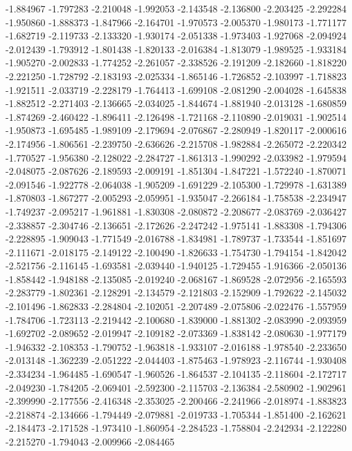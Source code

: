 -1.884967
-1.797283
-2.210048
-1.992053
-2.143548
-2.136800
-2.203425
-2.292284
-1.950860
-1.888373
-1.847966
-2.164701
-1.970573
-2.005370
-1.980173
-1.771177
-1.682719
-2.119733
-2.133320
-1.930174
-2.051338
-1.973403
-1.927068
-2.094924
-2.012439
-1.793912
-1.801438
-1.820133
-2.016384
-1.813079
-1.989525
-1.933184
-1.905270
-2.002833
-1.774252
-2.261057
-2.338526
-2.191209
-2.182660
-1.818220
-2.221250
-1.728792
-2.183193
-2.025334
-1.865146
-1.726852
-2.103997
-1.718823
-1.921511
-2.033719
-2.228179
-1.764413
-1.699108
-2.081290
-2.004028
-1.645838
-1.882512
-2.271403
-2.136665
-2.034025
-1.844674
-1.881940
-2.013128
-1.680859
-1.874269
-2.460422
-1.896411
-2.126498
-1.721168
-2.110890
-2.019031
-1.902514
-1.950873
-1.695485
-1.989109
-2.179694
-2.076867
-2.280949
-1.820117
-2.000616
-2.174956
-1.806561
-2.239750
-2.636626
-2.215708
-1.982884
-2.265072
-2.220342
-1.770527
-1.956380
-2.128022
-2.284727
-1.861313
-1.990292
-2.033982
-1.979594
-2.048075
-2.087626
-2.189593
-2.009191
-1.851304
-1.847221
-1.572240
-1.870071
-2.091546
-1.922778
-2.064038
-1.905209
-1.691229
-2.105300
-1.729978
-1.631389
-1.870803
-1.867277
-2.005293
-2.059951
-1.935047
-2.266184
-1.758538
-2.234947
-1.749237
-2.095217
-1.961881
-1.830308
-2.080872
-2.208677
-2.083769
-2.036427
-2.338857
-2.304746
-2.136651
-2.172626
-2.247242
-1.975141
-1.883308
-1.794306
-2.228895
-1.909043
-1.771549
-2.016788
-1.834981
-1.789737
-1.733544
-1.851697
-2.111671
-2.018175
-2.149122
-2.100490
-1.826633
-1.754730
-1.794154
-1.842042
-2.521756
-2.116145
-1.693581
-2.039440
-1.940125
-1.729455
-1.916366
-2.050136
-1.858442
-1.948188
-2.135085
-2.019240
-2.068167
-1.869528
-2.072956
-2.165593
-2.283779
-1.802361
-2.128291
-2.134579
-2.121803
-2.152909
-1.792622
-2.145032
-2.101496
-1.862833
-2.284804
-2.102051
-2.207489
-2.075806
-2.022476
-1.557959
-1.784706
-1.723113
-2.219442
-2.100680
-1.839000
-1.881302
-2.083990
-2.093959
-1.692702
-2.089652
-2.019947
-2.109182
-2.073369
-1.838142
-2.080630
-1.977179
-1.946332
-2.108353
-1.790752
-1.963818
-1.933107
-2.016188
-1.978540
-2.233650
-2.013148
-1.362239
-2.051222
-2.044403
-1.875463
-1.978923
-2.116744
-1.930408
-2.334234
-1.964485
-1.690547
-1.960526
-1.864537
-2.104135
-2.118604
-2.172717
-2.049230
-1.784205
-2.069401
-2.592300
-2.115703
-2.136384
-2.580902
-1.902961
-2.399990
-2.177556
-2.416348
-2.353025
-2.200466
-2.241966
-2.018974
-1.883823
-2.218874
-2.134666
-1.794449
-2.079881
-2.019733
-1.705344
-1.851400
-2.162621
-2.184473
-2.171528
-1.973410
-1.860954
-2.284523
-1.758804
-2.242934
-2.122280
-2.215270
-1.794043
-2.009966
-2.084465
